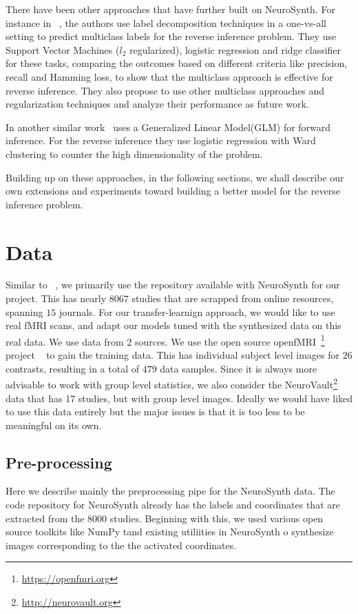 \documentclass{article} %
\begin{document}
There have been other approaches that have further built on NeuroSynth. For instance in ~\cite{sanmi2013multi}, the authors use label decomposition techniques in a one-vs-all setting to predict multiclass labels for the reverse inference problem. They use Support Vector Machines ($l_2$ regularized), logistic regression and ridge classifier for these tasks,  comparing the outcomes based on different criteria like precision, recall and Hamming loss, to show that the multiclass approach is effective for reverse inference. They also propose to use other multiclass approaches and regularization techniques and analyze their performance as future work. 

In another similar work~\cite{schwartz2013mapping} uses a Generalized Linear Model(GLM) for forward inference. For the reverse inference they use logistic regression with Ward clustering to counter the high dimensionality of the problem. 

Building up on these approaches,  in the following sections, we shall describe our own extensions and experiments toward building a better model for the reverse inference problem.

\section{Data}
Similar to ~\cite{yarkoni2011large}, we primarily use the repository available with NeuroSynth for our project. This has nearly $8067$ studies that are scrapped from online resources, spanning $15$ journals. For our transfer-learnign approach, we would like to use real fMRI scans, and adapt our models tuned with the synthesized data on this real data. We use data from 2 sources. We use the open source openfMRI~\footnote{\protect \url{https://openfmri.org}} project ~\cite{poldrack2013toward} to gain the training data. This has individual subject level images for $26$ contrasts, resulting in a total of $479$ data samples. Since it is always more advisable to work with group level statistics, we also consider the NeuroVault\footnote{\protect \url{http://neurovault.org}} data that has 17 studies, but with group level images. Ideally we would have liked to use this data entirely but the major issues is that it is too less to be meaningful on its own. 
\subsection{Pre-processing}
\label{sec:preprocess}
Here we describe mainly the preprocessing pipe for the NeuroSynth data. The code repository for NeuroSynth already has the labels and coordinates that are extracted from the $8000$ studies. Beginning with this, we used various open source toolkits like NumPy tand existing utiliities in NeuroSynth o synthesize images corresponding to the the activated coordinates. 
\end{document}

